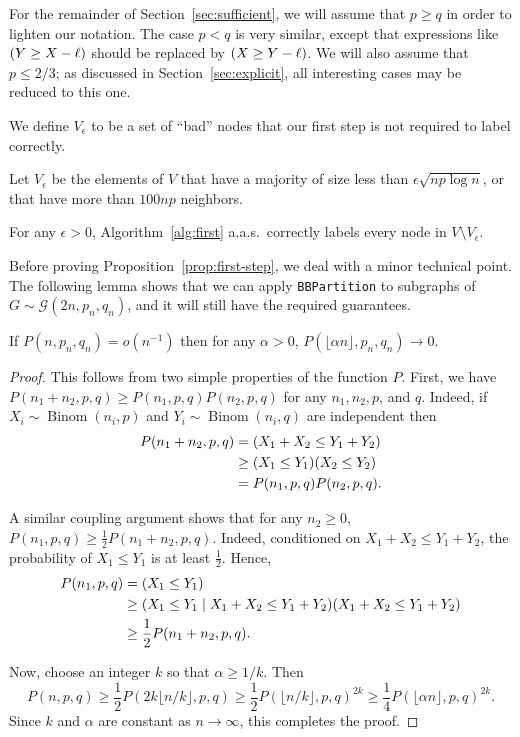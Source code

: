 \documentclass[EJP]{ejpecp}
\newcommand{\1}[1]{\mathbbm{1}_{\{#1\}}}
\newcommand{\calG}{\mathcal{G}}
\let\Pr\relax
\DeclareMathOperator{\Pr}{Pr}
\DeclareMathOperator{\Binom}{Binom}
\begin{document}
For the remainder of Section~\ref{sec:sufficient}, we will assume
that $p \ge q$ in order to lighten our notation. The case $p < q$
is very similar, except that expressions like $\Pr(Y \ge X - \ell)$ should
be replaced by $\Pr(X \ge Y - \ell)$. We will also assume that $p \le 2/3$;
as discussed in Section~\ref{sec:explicit}, all interesting cases may be
reduced to this one.

We define $V_\epsilon$ to be a set of ``bad'' nodes
that our first step is not required to label correctly.
\begin{definition}
 Let $V_\epsilon$ be the elements of $V$ that have a majority of
 size less than $\epsilon \sqrt{n p \log n}$, or that have more than
 $100np$ neighbors.
\end{definition}


\begin{proposition}\label{prop:first-step}
  For any $\epsilon > 0$,
 Algorithm~\ref{alg:first} a.a.s.\ correctly labels every node
 in $V \setminus V_\epsilon$.
\end{proposition}

Before proving Proposition~\ref{prop:first-step}, we deal with a minor
technical point.
The following lemma shows that we can apply {\tt BBPartition} to subgraphs
of $G \sim \calG(2n, p_n, q_n)$, and it will still have the required guarantees.

\begin{lemma}
 If $P(n, p_n, q_n) = o(n^{-1})$ then for any $\alpha > 0$,
 $P(\lfloor \alpha n \rfloor, p_n, q_n) \to 0$.
\end{lemma}

\begin{proof}
This follows from two simple properties of the function $P$.
First, we have $P(n_1 + n_2, p, q) \ge P(n_1, p, q) P(n_2, p, q)$ for
any $n_1, n_2, p$, and $q$. Indeed, if $X_i \sim \Binom(n_i, p)$
and $Y_i \sim \Binom(n_i, q)$ are independent then
\begin{align*}
 P(n_1 + n_2, p, q)
 &= \Pr(X_1 + X_2 \le Y_1 + Y_2) \\
 &\ge \Pr(X_1 \le Y_1) \Pr(X_2 \le Y_2) \\
 &= P(n_1, p, q) P(n_2, p, q).
\end{align*}

A similar coupling argument shows that for any $n_2 \ge 0$,
$P(n_1, p, q) \ge \frac 12 P(n_1 + n_2, p, q)$. Indeed, conditioned on
$X_1 + X_2 \le Y_1 + Y_2$, the probability of $X_1 \le Y_1$ is at least $\frac 12$.
Hence,
\begin{align*}
P(n_1, p, q)
&= \Pr(X_1 \le Y_1) \\
&\ge \Pr(X_1 \le Y_1 \mid X_1 + X_2 \le Y_1 + Y_2) \Pr(X_1 + X_2 \le Y_1 + Y_2) \\
&\ge \frac 12 P(n_1 + n_2, p, q).
\end{align*}

Now, choose an integer $k$ so that $\alpha \ge 1/k$. Then
\[
 P(n, p, q) \ge \frac 12 P(2k \lfloor n/k\rfloor, p, q)
 \ge \frac 12 P(\lfloor n/k \rfloor, p, q)^{2k}
 \ge \frac 14 P(\lfloor \alpha n \rfloor, p, q)^{2k}.
\]
Since $k$ and $\alpha$ are constant as $n \to \infty$, this completes the proof.
\end{proof}
\end{document}
